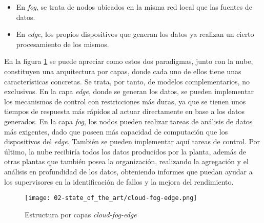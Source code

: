 \begin{itemize}
  \item En \textit{fog}, se trata de nodos ubicados en la misma red local que
        las fuentes de datos.
  \item En \textit{edge}, los propios dispositivos que generan los datos ya
        realizan un cierto procesamiento de los mismos.
\end{itemize}

En la figura \ref{fig:02-cloud_fog_edge} se puede apreciar como estos dos
paradigmas, junto con la nube, constituyen una arquitectura por capas, donde
cada uno de ellos tiene unas características concretas. Se trata, por tanto, de
modelos complementarios, no exclusivos. En la capa \textit{edge}, donde se
generan los datos, se pueden implementar los mecanismos de control con
restricciones más duras, ya que se tienen unos tiempos de respuesta más rápidos
al actuar directamente en base a los datos generados. En la capa \textit{fog},
los nodos pueden realizar tareas de análisis de datos más exigentes, dado que
poseen más capacidad de computación que los dispositivos del \textit{edge}.
También se pueden implementar aquí tareas de control. Por último, la nube
recibiría todos los datos producidos por la planta, además de otras plantas que
también posea la organización, realizando la agregación y el análisis en
profundidad de los datos, obteniendo informes que puedan ayudar a los
supervisores en la identificación de fallos y la mejora del rendimiento.

\begin{figure}
  \centering
  \texttt{[image: 02-state\_of\_the\_art/cloud-fog-edge.png]}
  \caption{Estructura por capas \textit{cloud-fog-edge}}
  \label{fig:02-cloud_fog_edge}
\end{figure}

